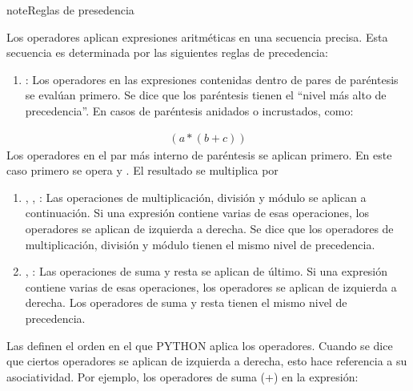 \documentclass[letterpaper,10pt,spanish]{sphinxmanual}
\begin{document}
\begin{sphinxadmonition}{note}{Reglas de presedencia}

\sphinxAtStartPar
Los operadores aplican expresiones aritméticas en una secuencia precisa. Esta secuencia es determinada por las siguientes reglas de precedencia:
\begin{enumerate}
%
\item {} 
\sphinxAtStartPar
{}: Los operadores en las expresiones contenidas dentro de pares de paréntesis se evalúan primero. Se dice que los paréntesis tienen el “nivel más alto de precedencia”. En casos de paréntesis anidados o incrustados, como:

\end{enumerate}
\begin{equation*}
\begin{split}
( a * ( b + c ) )
\end{split}
\end{equation*}
\sphinxAtStartPar
Los operadores en el par más interno de paréntesis se aplican primero.
En este caso primero se opera  y . El resultado se multiplica por 
\begin{enumerate}
%
\setcounter{enumi}{1}
\item {} 
\sphinxAtStartPar
{} \sphinxguilabel{*} ,  \sphinxguilabel{/} ,  \sphinxguilabel{\%}: Las operaciones de multiplicación, división y módulo se aplican a continuación. Si una expresión contiene varias de esas operaciones, los operadores se aplican de izquierda a derecha. Se dice que los operadores de multiplicación, división y módulo tienen el mismo nivel de precedencia.

\item {} 
\sphinxAtStartPar
{} \sphinxguilabel{+},  \sphinxguilabel{\sphinxhyphen{}}: Las operaciones de suma y resta se aplican de último. Si una expresión contiene varias de esas operaciones, los operadores se aplican de izquierda a derecha. Los operadores de suma y resta tienen el mismo nivel de precedencia.

\end{enumerate}
\end{sphinxadmonition}

\sphinxAtStartPar
Las  definen el orden en el que PYTHON aplica los operadores. Cuando se dice que ciertos operadores se aplican de izquierda a derecha, esto hace referencia a su asociatividad. Por ejemplo, los operadores de suma (+) en la expresión:
\end{document}
